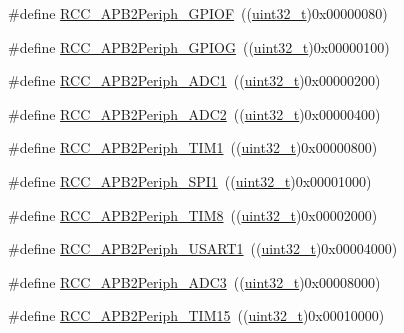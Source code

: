 \begin{DoxyCompactItemize}
\item 
\#define \hyperlink{group___a_p_b2__peripheral_ga2dbb1e1116b57621c585e1b52c894bda}{R\+C\+C\+\_\+\+A\+P\+B2\+Periph\+\_\+\+G\+P\+I\+OF}~((\hyperlink{_p_e___types_8h_a33594304e786b158f3fb30289278f5af}{uint32\+\_\+t})0x00000080)
\item 
\#define \hyperlink{group___a_p_b2__peripheral_gaba82756d2060b97c62eb555242361b2e}{R\+C\+C\+\_\+\+A\+P\+B2\+Periph\+\_\+\+G\+P\+I\+OG}~((\hyperlink{_p_e___types_8h_a33594304e786b158f3fb30289278f5af}{uint32\+\_\+t})0x00000100)
\item 
\#define \hyperlink{group___a_p_b2__peripheral_gacd24acb2cd5ca208652157f6c13d3145}{R\+C\+C\+\_\+\+A\+P\+B2\+Periph\+\_\+\+A\+D\+C1}~((\hyperlink{_p_e___types_8h_a33594304e786b158f3fb30289278f5af}{uint32\+\_\+t})0x00000200)
\item 
\#define \hyperlink{group___a_p_b2__peripheral_ga4fd76e573e827702568d6064e33448b5}{R\+C\+C\+\_\+\+A\+P\+B2\+Periph\+\_\+\+A\+D\+C2}~((\hyperlink{_p_e___types_8h_a33594304e786b158f3fb30289278f5af}{uint32\+\_\+t})0x00000400)
\item 
\#define \hyperlink{group___a_p_b2__peripheral_ga0d9babf212897db0b3aa852f8a71160b}{R\+C\+C\+\_\+\+A\+P\+B2\+Periph\+\_\+\+T\+I\+M1}~((\hyperlink{_p_e___types_8h_a33594304e786b158f3fb30289278f5af}{uint32\+\_\+t})0x00000800)
\item 
\#define \hyperlink{group___a_p_b2__peripheral_ga289cc086580f4b6a080ea0ed3dd4a7af}{R\+C\+C\+\_\+\+A\+P\+B2\+Periph\+\_\+\+S\+P\+I1}~((\hyperlink{_p_e___types_8h_a33594304e786b158f3fb30289278f5af}{uint32\+\_\+t})0x00001000)
\item 
\#define \hyperlink{group___a_p_b2__peripheral_gac951d41a08140a7d38a4faff8dd1e03e}{R\+C\+C\+\_\+\+A\+P\+B2\+Periph\+\_\+\+T\+I\+M8}~((\hyperlink{_p_e___types_8h_a33594304e786b158f3fb30289278f5af}{uint32\+\_\+t})0x00002000)
\item 
\#define \hyperlink{group___a_p_b2__peripheral_ga14e1b3b6d84801c223a37a954b5b1910}{R\+C\+C\+\_\+\+A\+P\+B2\+Periph\+\_\+\+U\+S\+A\+R\+T1}~((\hyperlink{_p_e___types_8h_a33594304e786b158f3fb30289278f5af}{uint32\+\_\+t})0x00004000)
\item 
\#define \hyperlink{group___a_p_b2__peripheral_ga371d55bbf17bf965a213c59f2d276d72}{R\+C\+C\+\_\+\+A\+P\+B2\+Periph\+\_\+\+A\+D\+C3}~((\hyperlink{_p_e___types_8h_a33594304e786b158f3fb30289278f5af}{uint32\+\_\+t})0x00008000)
\item 
\#define \hyperlink{group___a_p_b2__peripheral_ga774f9082c3331890c06b9fd9deafe549}{R\+C\+C\+\_\+\+A\+P\+B2\+Periph\+\_\+\+T\+I\+M15}~((\hyperlink{_p_e___types_8h_a33594304e786b158f3fb30289278f5af}{uint32\+\_\+t})0x00010000)

\end{DoxyCompactItemize}

